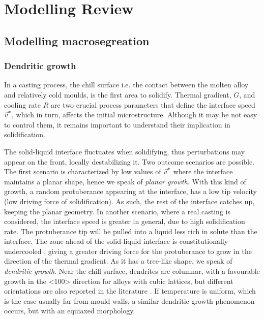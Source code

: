 \chapter{Modelling Review}
\begin{nolinkcolors} 
\minitoc
\end{nolinkcolors}
\newpage

\section{Modelling macrosegreation}
%
\subsection{Dendritic growth}
In a casting process, the chill surface i.e. the contact between the molten alloy and relatively cold moulds, is the first area to solidify. 
Thermal gradient, $G$, and cooling rate $R$ are two crucial process parameters that define the interface speed $\vec{v}^\text{*}$, which in turn,
affects the initial microstructure. Although it may be not easy to control them, it remains important to understand their implication in solidification.

The solid-liquid interface fluctuates when solidifying, thus perturbations may appear on the front, locally destabilizing it. 
Two outcome scenarios are possible.
The first scenario is characterized by low values of $\vec{v}^\text{*}$ where the interface maintains a planar shape, hence we speak of \emph{planar growth}. 
With this kind of growth, a random protuberance appearing at the interface, has a low tip velocity (low driving force of solidification). As such,
the rest of the interface catches up, keeping the planar geometry.
In another scenario, where a real casting is considered, the interface speed is greater in general, due to high solidification rate.
The protuberance tip will be pulled into a liquid less rich in solute than the interface. The zone ahead of the solid-liquid interface is constitutionally undercooled \citep{tiller_redistribution_1953}, giving a greater driving force for the protuberance to grow in the direction
of the thermal gradient. As it has a tree-like shape, we speak of \emph{dendritic growth}. Near the chill surface, dendrites are columnar, with a 
favourable growth in the <100> direction for alloys with cubic lattices, but different orientations are also reported in the literature \citep[see][289]{dantzig_solidification_2009}.
If temperature is uniform, which is the case usually far from mould walls, a similar dendritic growth phenomenon occurs, but with an equiaxed morphology.

